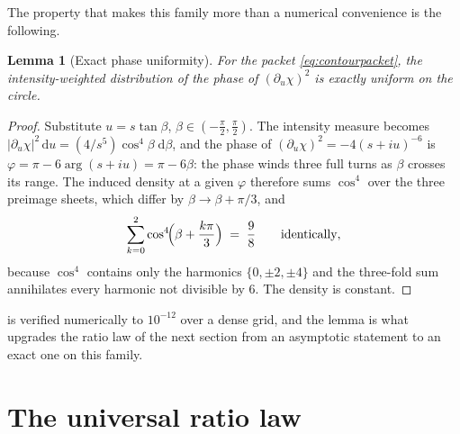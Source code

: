 \documentclass[11pt,a4paper]{article}
\newcommand{\dd}{\mathrm{d}}
\theoremstyle{plain}
\newtheorem{lemma}{Lemma}
\theoremstyle{definition}
\begin{document}
The property that makes this family more than a numerical convenience is the
following.

\begin{lemma}[Exact phase uniformity]
\label{lem:uniform}
For the packet \cref{eq:contourpacket}, the intensity-weighted distribution
of the phase of $(\partial_u\chi)^2$ is exactly uniform on the circle.
\end{lemma}

\begin{proof}
Substitute $u = s\tan\beta$, $\beta \in (-\tfrac\pi2, \tfrac\pi2)$. The
intensity measure becomes
$|\partial_u\chi|^2\,\dd u = (4/s^5)\cos^4\!\beta\;\dd\beta$, and the phase
of $(\partial_u\chi)^2 = -4(s+iu)^{-6}$ is
$\varphi = \pi - 6\arg(s+iu) = \pi - 6\beta$: the phase winds three full
turns as $\beta$ crosses its range. The induced density at a given
$\varphi$ therefore sums $\cos^4$ over the three preimage sheets, which
differ by $\beta \to \beta + \pi/3$, and
%
\begin{equation}
\sum_{k=0}^{2} \cos^4\!\Bigl(\beta + \frac{k\pi}{3}\Bigr)
\;=\; \frac{9}{8}
\qquad \text{identically},
\label{eq:harmonic}
\end{equation}
%
because $\cos^4$ contains only the harmonics $\{0, \pm2, \pm4\}$ and the
three-fold sum annihilates every harmonic not divisible by $6$. The
density is constant.
\end{proof}

 is verified numerically to $10^{-12}$ over a dense grid,
and the lemma is what upgrades the ratio law of the next section from an
asymptotic statement to an exact one on this family.


\section{The universal ratio law}
\label{sec:ratio}
\end{document}
